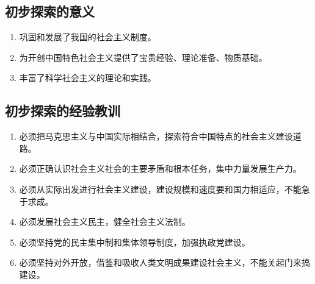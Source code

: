     \subsection{初步探索的意义}
    \begin{enumerate}
        \item 巩固和发展了我国的社会主义制度。
        \item 为开创中国特色社会主义提供了宝贵经验、理论准备、物质基础。
        \item 丰富了科学社会主义的理论和实践。
    \end{enumerate}

    \subsection{初步探索的经验教训}
    \begin{enumerate}
        \item 必须把马克思主义与中国实际相结合，探索符合中国特点的社会主义建设道路。
        \item 必须正确认识社会主义社会的主要矛盾和根本任务，集中力量发展生产力。
        \item 必须从实际出发进行社会主义建设，建设规模和速度要和国力相适应，不能急于求成。
        \item 必须发展社会主义民主，健全社会主义法制。
        \item 必须坚持党的民主集中制和集体领导制度，加强执政党建设。
        \item 必须坚持对外开放，借鉴和吸收人类文明成果建设社会主义，不能关起门来搞建设。
    \end{enumerate}